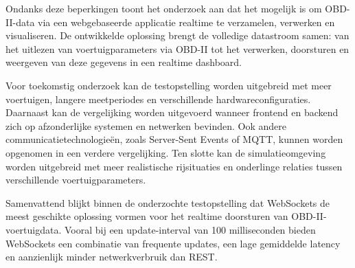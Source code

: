 Ondanks deze beperkingen toont het onderzoek aan dat het mogelijk is om
OBD-II-data via een webgebaseerde applicatie realtime te verzamelen, verwerken
en visualiseren. De ontwikkelde oplossing brengt de volledige datastroom samen:
van het uitlezen van voertuigparameters via OBD-II tot het verwerken,
doorsturen en weergeven van deze gegevens in een realtime dashboard.

Voor toekomstig onderzoek kan de testopstelling worden uitgebreid met meer
voertuigen, langere meetperiodes en verschillende hardwareconfiguraties.
Daarnaast kan de vergelijking worden uitgevoerd wanneer frontend en backend
zich op afzonderlijke systemen en netwerken bevinden. Ook andere
communicatietechnologieën, zoals Server-Sent Events of MQTT, kunnen worden
opgenomen in een verdere vergelijking. Ten slotte kan de simulatieomgeving
worden uitgebreid met meer realistische rijsituaties en onderlinge relaties
tussen verschillende voertuigparameters.

Samenvattend blijkt binnen de onderzochte testopstelling dat WebSockets de
meest geschikte oplossing vormen voor het realtime doorsturen van
OBD-II-voertuigdata. Vooral bij een update-interval van 100 milliseconden bieden
WebSockets een combinatie van frequente updates, een lage gemiddelde latency
en aanzienlijk minder netwerkverbruik dan REST.